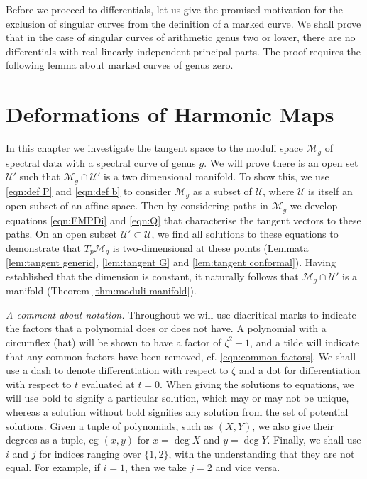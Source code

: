 \documentclass{article}
\begin{document}

Before we proceed to differentials, let us give the promised motivation for the exclusion of singular curves from the definition of a marked curve. We shall prove that in the case of singular curves of arithmetic genus two or lower, there are no differentials with real linearly independent principal parts. The proof requires the following lemma about marked curves of genus zero.








\section{Deformations of Harmonic Maps}
In this chapter we investigate the tangent space to the moduli space $\mathcal{M}_g$ of spectral data with a spectral curve of genus $g$. We will prove there is an open set $\mathcal{U}'$ such that $\mathcal{M}_g \cap \mathcal{U}'$ is a two dimensional manifold. To show this, we use \eqref{eqn:def P} and \eqref{eqn:def b} to consider $\mathcal{M}_g$ as a subset of $\mathcal{U}$, where $\mathcal{U}$ is itself an open subset of an affine space. Then by considering paths in $\mathcal{M}_g$ we develop equations \eqref{eqn:EMPDi} and \eqref{eqn:Q} that characterise the tangent vectors to these paths. On an open subset $\mathcal{U}' \subset \mathcal{U}$, we find all solutions to these equations to demonstrate that $T_p\mathcal{M}_g$ is two-dimensional at these points (Lemmata \ref{lem:tangent generic}, \ref{lem:tangent G} and \ref{lem:tangent conformal}). Having established that the dimension is constant, it naturally follows that $\mathcal{M}_g\cap \mathcal{U}'$ is a manifold (Theorem \ref{thm:moduli manifold}).

\emph{A comment about notation.} Throughout we will use diacritical marks to indicate the factors that a polynomial does or does not have. A polynomial with a circumflex (hat) will be shown to have a factor of $\zeta^2-1$, and a tilde will indicate that any common factors have been removed, cf. \eqref{eqn:common factors}. We shall use a dash to denote differentiation with respect to $\zeta$ and a dot for differentiation with respect to $t$ evaluated at $t=0$.
When giving the solutions to equations, we will use bold to signify a particular solution, which may or may not be unique, whereas a solution without bold signifies any solution from the set of potential solutions. Given a tuple of polynomials, such as $(X,Y)$, we also give their degrees as a tuple, eg $(x,y)$ for $x=\deg X$ and $y=\deg Y$. Finally, we shall use $i$ and $j$ for indices ranging over $\{1,2\}$, with the understanding that they are not equal. For example, if $i=1$, then we take $j=2$ and vice versa.
\end{document}
